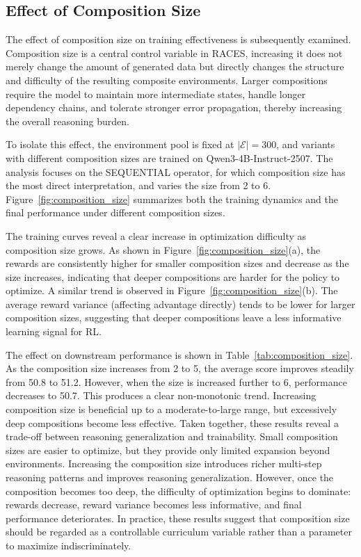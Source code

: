\subsection{Effect of Composition Size}
\label{sec:composition_size}

The effect of composition size on training effectiveness is subsequently examined.
Composition size is a central control variable in RACES, increasing it does not merely change the amount of generated data but directly changes the structure and difficulty of the resulting composite environments.
Larger compositions require the model to maintain more intermediate states, handle longer dependency chains, and tolerate stronger error propagation, thereby increasing the overall reasoning burden.

To isolate this effect, the environment pool is fixed at $|\mathcal{E}|=300$, and variants with different composition sizes are trained on Qwen3-4B-Instruct-2507.
The analysis focuses on the \textsc{SEQUENTIAL} operator, for which composition size has the most direct interpretation, and varies the size from 2 to 6.
Figure~\ref{fig:composition_size} summarizes both the training dynamics and the final performance under different composition sizes.

The training curves reveal a clear increase in optimization difficulty as composition size grows.
As shown in Figure~\ref{fig:composition_size}(a), the rewards are consistently higher for smaller composition sizes and decrease as the size increases, indicating that deeper compositions are harder for the policy to optimize.
A similar trend is observed in Figure~\ref{fig:composition_size}(b). The average reward variance (affecting advantage directly) tends to be lower for larger composition sizes, suggesting that deeper compositions leave a less informative learning signal for RL.

The effect on downstream performance is shown in Table~\ref{tab:composition_size}.
As the composition size increases from 2 to 5, the average score improves steadily from 50.8 to 51.2.
However, when the size is increased further to 6, performance decreases to 50.7.
This produces a clear non-monotonic trend. Increasing composition size is beneficial up to a moderate-to-large range, but excessively deep compositions become less effective.
Taken together, these results reveal a trade-off between reasoning generalization and trainability.
Small composition sizes are easier to optimize, but they provide only limited expansion beyond environments.
Increasing the composition size introduces richer multi-step reasoning patterns and improves reasoning generalization.
However, once the composition becomes too deep, the difficulty of optimization begins to dominate: rewards decrease, reward variance becomes less informative, and final performance deteriorates.
In practice, these results suggest that composition size should be regarded as a controllable curriculum variable rather than a parameter to maximize indiscriminately.

